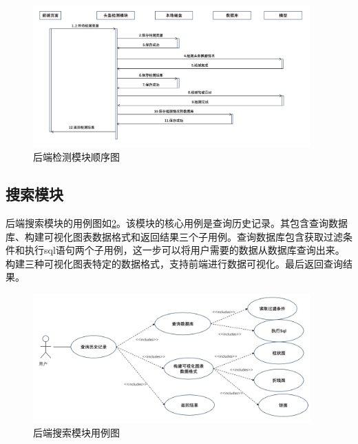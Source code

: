 \begin{figure}[!htb]
    \centering
    \includegraphics[width=0.95\textwidth]{figs/chap05/seq3.png}
    \caption{后端检测模块顺序图}
    \label{fig:seq3}
\end{figure}




\subsection{搜索模块}

后端搜索模块的用例图如\ref{fig:uml4}。该模块的核心用例是查询历史记录。其包含查询数据库、构建可视化图表数据格式和返回结果三个子用例。查询数据库包含获取过滤条件和执行sql语句两个子用例，这一步可以将用户需要的数据从数据库查询出来。构建三种可视化图表特定的数据格式，支持前端进行数据可视化。最后返回查询结果。

\begin{figure}[!htb]
    \centering
    \includegraphics[width=0.95\textwidth]{figs/chap05/uml4.png}
    \caption{后端搜索模块用例图}
    \label{fig:uml4}
\end{figure}


